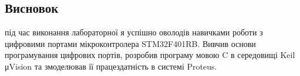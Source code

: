 \documentclass[12pt]{extarticle}
\begin{document}
\vspace{12pt}

\subsection*{Висновок} 
під час виконання лабораторної я успішно оволодів навичками роботи з цифровими портами мікроконтролера STM32F401RB. Вивчив основи програмування цифрових портів, розробив програму мовою C  в середовищі Keil μVision та змоделював її працездатність в системі Proteus.
\end{document}
